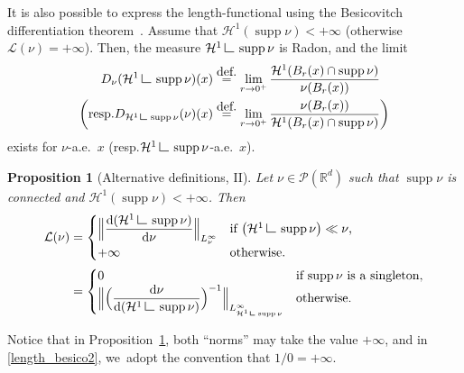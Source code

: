 \documentclass[11pt]{article}
\newcommand{\resp}{resp.\xspace}
\numberwithin{equation}{section}
\newtheorem{proposition}[theorem]{Proposition}
\theoremstyle{definition}
\newcommand{\eqdef}{\ensuremath{\stackrel{\mbox{\upshape\tiny def.}}{=}}}
\newcommand{\Bnorm}[1]{\Bigl\lVert#1\Bigr\rVert}
\newcommand\LM[1]{\hbox{\vrule width.5pt \vbox to#1pt{\vfill \hrule width#1pt height.5pt}}}
\newcommand\LL{{\mathchoice {\>\LM7\>}{\>\LM7\>}{\,\LM5\,}{\,\LM{3.35}\,}}}
\newcommand{\mres}{\LL}
\newcommand\cH{\mathcal{H}}
\newcommand{\RR}{\mathbb{R}}
\DeclareMathOperator{\supp}{supp}
\newcommand\dd{\mathrm{d}}
\begin{document}
It is also possible to express the length-functional using the Besicovitch differentiation theorem~\cite[Th.\,2.22]{ambrosio2000functions}. Assume that $\cH^1(\supp \nu)<+\infty$ (otherwise $\mathcal{L}(\nu)=+\infty$). Then, the measure $\cH^1\mres \supp\nu$ is Radon, and the limit
\begin{align}
D_\nu(\cH^1\mres \supp\nu)(x)&\eqdef \lim_{r \to 0^+} \frac{\cH^1(B_r(x)\cap \supp \nu)}{\nu(B_r(x))} \\ \bigg(\mbox{\resp} D_{\cH^1\mres \supp\nu}(\nu)(x)&\eqdef \lim_{r \to 0^+}\frac{\nu(B_r(x))}{\cH^1(B_r(x)\cap \supp \nu)}\bigg)
\end{align}
exists for $\nu$-a.e.\ $x$ (\resp $\cH^1\mres \supp\nu$-a.e.\ $x$).
\begin{proposition}[Alternative definitions, II]\label{prop.length.besico}
Let $\nu \in \mathcal{P}(\RR^d)$ such that $\supp \nu$ is connected and $\cH^1(\supp \nu)<+\infty$. Then
\begin{align}
\mathcal{L}(\nu) &=
\begin{cases}
\Bnorm{\dfrac{\dd(\cH^1\mres \supp\nu)}{\dd \nu}}_{L^{\infty}_\nu} & \mbox{if $\left(\cH^1\mres \supp \nu\right) \ll \nu$,}\\
+\infty &\mbox{otherwise.}
\end{cases}\label{length_besico1}\\
&=
\begin{cases}
0 & \mbox{if $\supp \nu$ is a singleton,}\\
\Bnorm{\Bigl(\dfrac{\dd \nu}{\dd(\cH^1\mres \supp\nu)}\Bigr)^{-1}}_{L^{\infty}_{\cH^1\mres \supp\nu}} & \mbox{otherwise}.
\end{cases}\label{length_besico2}
\end{align}
\end{proposition}
Notice that in Proposition~\ref{prop.length.besico}, both ``norms'' may take the value $+\infty$, and in \eqref{length_besico2}, we~adopt the convention that $1/0=+\infty$.
\end{document}
